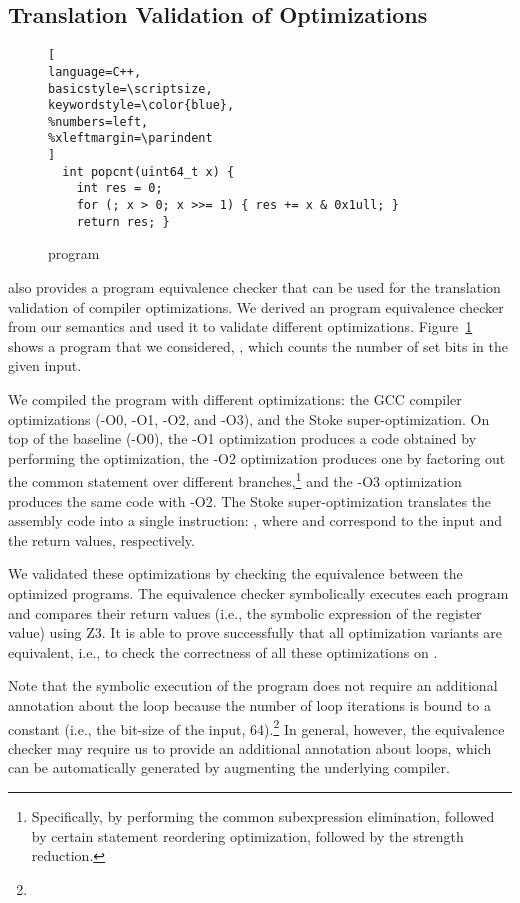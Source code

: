 \subsection{Translation Validation of Optimizations}
\begin{figure}
\begin{lstlisting}[
language=C++,
basicstyle=\scriptsize,
keywordstyle=\color{blue},
%numbers=left,
%xleftmargin=\parindent
]
  int popcnt(uint64_t x) {
    int res = 0;
    for (; x > 0; x >>= 1) { res += x & 0x1ull; }
    return res; }
\end{lstlisting}
\vspace{-5pt}
\caption{ program}
\label{fig:popcnt}
\end{figure}


\K also provides a program equivalence checker that can be used for the translation validation of compiler optimizations.
We derived an \ISA program equivalence checker from our semantics and used it to validate different optimizations.
Figure~\ref{fig:popcnt} shows a program that we considered, , which counts the number of set bits in the given input.

We compiled the program with different optimizations: the GCC compiler optimizations (-O0, -O1, -O2, and -O3), and the Stoke super-optimization.
On top of the baseline (-O0), the -O1 optimization produces a code obtained by performing the  optimization, the -O2 optimization produces one by factoring out the common statement over different branches,\footnote{Specifically, by performing the common subexpression elimination, followed by certain statement reordering optimization, followed by the strength reduction.} and the -O3 optimization produces the same code with -O2. The Stoke super-optimization translates the assembly code into a single instruction: , where  and  correspond to the input and the return values, respectively.

We validated these optimizations by checking the equivalence between the optimized programs.
The equivalence checker symbolically executes each program and compares their return values (i.e., the symbolic expression of the  register value) using Z3.
It is able to prove successfully that all optimization variants are equivalent, i.e., to check the correctness of all these optimizations on .

Note that the symbolic execution of the  program does not require an additional annotation about the loop because the number of loop iterations is bound to a constant (i.e., the bit-size of the input, 64).\footnote{%
}
In general, however, the equivalence checker may require us to provide an additional annotation about loops, which can be automatically generated by augmenting the underlying compiler.




